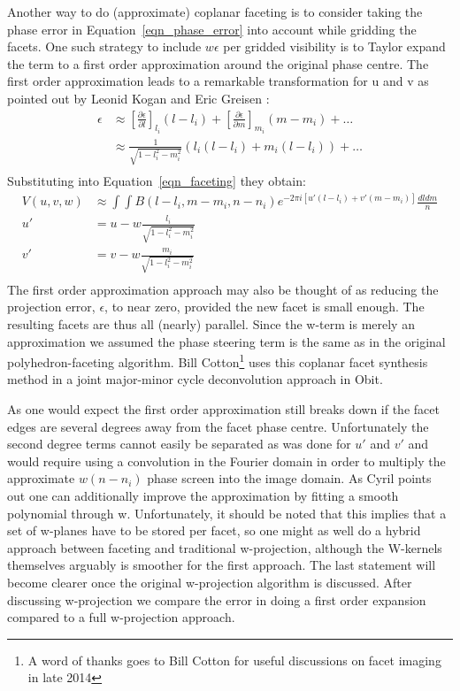 Another way to do (approximate) coplanar faceting is to consider taking the phase error in Equation~\ref{eqn_phase_error} into account while gridding the facets.
One such strategy to include $w\epsilon$ per gridded visibility is to Taylor expand the term to a first order approximation around the original phase centre. The 
first order approximation leads to a remarkable transformation for u and v as pointed out by Leonid Kogan and Eric Greisen \cite{aipsfaceting}:
\begin{equation}
 \begin{split}
  \epsilon&\approx \left[\frac{\partial \epsilon}{\partial l}\right]_{l_i}(l - l_i) + \left[\frac{\partial \epsilon}{\partial m}\right]_{m_i}(m - m_i) + \dots\\
  &\approx \frac{1}{\sqrt{1-l_i^2-m_i^2}}(l_i(l - l_i) + m_i(l - l_i)) + \dots\\
 \end{split}
\end{equation}
Substituting into Equation~\ref{eqn_faceting} they obtain:
\begin{equation}
 \begin{split}
  V(u,v,w)&\approx\int{\int{B(l-l_i,m-m_i,n-n_i)e^{-2{\pi}i[u'(l-l_i)+v'(m-m_i)]}\frac{dldm}{n}}}\\
  u'&=u - w\frac{l_i}{\sqrt{1-l_i^2-m_i^2}}\\
  v'&=v - w\frac{m_i}{\sqrt{1-l_i^2-m_i^2}}\\
 \end{split}
\end{equation}
The first order approximation approach may also be thought of as reducing the projection error, $\epsilon$, to near zero, provided the new facet is small enough. 
The resulting facets are thus all (nearly) parallel. Since the w-term is merely an approximation we assumed the phase steering term is the same as in the original
polyhedron-faceting algorithm. Bill Cotton\cite{obitfacetclean}\footnote{A word of thanks goes to Bill Cotton for useful discussions on facet imaging in late 2014} 
uses this coplanar facet synthesis method in a joint major-minor cycle deconvolution approach in Obit.

As one would expect the first order approximation still breaks down if the facet edges are several degrees away from the facet phase centre.
Unfortunately the second degree terms cannot easily be separated as was done for $u'$ and $v'$ and would require using a convolution in the Fourier domain
in order to multiply the approximate $w(n-n_i)$ phase screen into the image domain. As Cyril \cite{tassefaceting} points out one can additionally improve the approximation
by fitting a smooth polynomial through w. Unfortunately, it should be noted that this implies that a set of w-planes have to be stored per facet, so one might
as well do a hybrid approach between faceting and traditional w-projection, although the W-kernels themselves arguably is smoother for the first approach. The last
statement will become clearer once the original w-projection algorithm is discussed. After discussing w-projection we compare the error in doing a first 
order expansion compared to a full w-projection approach. 
